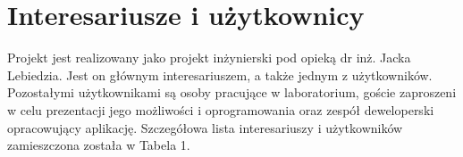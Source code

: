 \section{Interesariusze i użytkownicy}
Projekt jest realizowany jako projekt inżynierski pod opieką dr inż. Jacka Lebiedzia. Jest on głównym interesariuszem, a także jednym z użytkowników. Pozostałymi użytkownikami są osoby pracujące w laboratorium, goście zaproszeni w celu prezentacji jego możliwości i oprogramowania oraz zespół deweloperski opracowujący aplikację. Szczegółowa lista interesariuszy i użytkowników zamieszczona została w Tabela 1.

